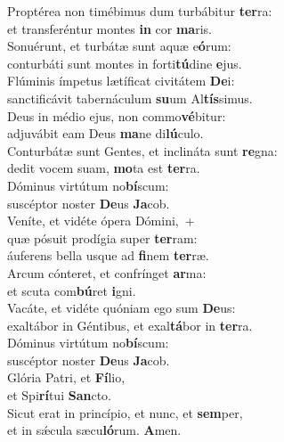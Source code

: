 \evenverse Proptérea non timébimus dum turbábitur \textbf{ter}ra:~\*\\
\evenverse et transferéntur montes \textbf{in} cor \textbf{ma}ris.\\
\oddverse Sonuérunt, et turbátæ sunt aquæ e\textbf{ó}rum:~\*\\
\oddverse conturbáti sunt montes in forti\textbf{tú}dine \textbf{e}jus.\\
\evenverse Flúminis ímpetus lætíficat civitátem \textbf{De}i:~\*\\
\evenverse sanctificávit tabernáculum \textbf{su}um Al\textbf{tís}simus.\\
\oddverse Deus in médio ejus, non commo\textbf{vé}bitur:~\*\\
\oddverse adjuvábit eam Deus \textbf{ma}ne di\textbf{lú}culo.\\
\evenverse Conturbátæ sunt Gentes, et inclináta sunt \textbf{re}gna:~\*\\
\evenverse dedit vocem suam, \textbf{mo}ta est \textbf{ter}ra.\\
\oddverse Dóminus virtútum no\textbf{bí}scum:~\*\\
\oddverse suscéptor noster \textbf{De}us \textbf{Ja}cob.\\
\evenverse Veníte, et vidéte ópera Dómini,~+\\
\evenverse  quæ pósuit prodígia super \textbf{ter}ram:~\*\\
\evenverse áuferens bella usque ad \textbf{fi}nem \textbf{ter}ræ.\\
\oddverse Arcum cónteret, et confrínget \textbf{ar}ma:~\*\\
\oddverse et scuta com\textbf{bú}ret \textbf{i}gni.\\
\evenverse Vacáte, et vidéte quóniam ego sum \textbf{De}us:~\*\\
\evenverse exaltábor in Géntibus, et exal\textbf{tá}bor in \textbf{ter}ra.\\
\oddverse Dóminus virtútum no\textbf{bí}scum:~\*\\
\oddverse suscéptor noster \textbf{De}us \textbf{Ja}cob.\\
\evenverse Glória Patri, et \textbf{Fí}lio,~\*\\
\evenverse et Spi\textbf{rí}tui \textbf{San}cto.\\
\oddverse Sicut erat in princípio, et nunc, et \textbf{sem}per,~\*\\
\oddverse et in sǽcula sæcu\textbf{ló}rum. \textbf{A}men.\\
